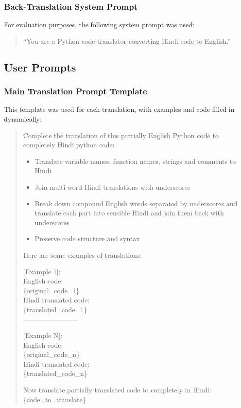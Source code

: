 \documentclass[11pt,a4paper]{article}
\begin{document}
\subsubsection{Back-Translation System Prompt}
For evaluation purposes, the following system prompt was used:
\begin{quote}
``You are a Python code translator converting Hindi code to English.''
\end{quote}

\subsection{User Prompts}
\subsubsection{Main Translation Prompt Template}
This template was used for each translation, with examples and code filled in dynamically:
\begin{quote}
Complete the translation of this partially English Python code to completely Hindi python code:
\begin{itemize}
\item Translate variable names, function names, strings and comments to Hindi
\item Join multi-word Hindi translations with underscores
\item Break down compound English words separated by underscores and translate each part into sensible Hindi and join them back with underscores
\item Preserve code structure and syntax
\end{itemize}

Here are some examples of translations:

[Example 1]:\\
English code:\\
\{original\_code\_1\}\\
Hindi translated code:\\
\{translated\_code\_1\}\\
------------------------

[Example N]:\\
English code:\\
\{original\_code\_n\}\\
Hindi translated code:\\
\{translated\_code\_n\}

Now translate partially translated code to completely in Hindi:\\
\{code\_to\_translate\}
\end{quote}
\end{document}
